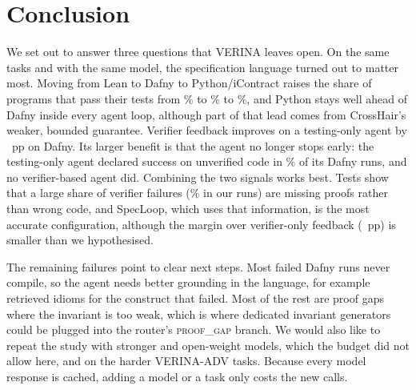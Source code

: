 \section{Conclusion}
\label{sec:conclusion}

We set out to answer three questions that VERINA leaves open. On the same \NTASKS{} tasks and with the same model, the specification language turned out to matter most. Moving from Lean to Dafny to Python/iContract raises the share of programs that pass their tests from \% to \% to \%, and Python stays well ahead of Dafny inside every agent loop, although part of that lead comes from CrossHair's weaker, bounded guarantee. Verifier feedback improves on a testing-only agent by ~pp on Dafny. Its larger benefit is that the agent no longer stops early: the testing-only agent declared success on unverified code in \% of its Dafny runs, and no verifier-based agent did. Combining the two signals works best. Tests show that a large share of verifier failures (\% in our runs) are missing proofs rather than wrong code, and SpecLoop, which uses that information, is the most accurate configuration, although the margin over verifier-only feedback (~pp) is smaller than we hypothesised.

The remaining failures point to clear next steps. Most failed Dafny runs never compile, so the agent needs better grounding in the language, for example retrieved idioms for the construct that failed. Most of the rest are proof gaps where the invariant is too weak, which is where dedicated invariant generators could be plugged into the router's \textsc{proof\_gap} branch. We would also like to repeat the study with stronger and open-weight models, which the budget did not allow here, and on the harder VERINA-ADV tasks. Because every model response is cached, adding a model or a task only costs the new calls.
